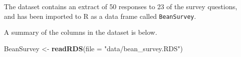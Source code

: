 \documentclass[
]{book}
\newenvironment{Shaded}{\begin{snugshade}}{\end{snugshade}}
\newcommand{\DataTypeTok}[1]{\textcolor[rgb]{0.13,0.29,0.53}{#1}}
\newcommand{\KeywordTok}[1]{\textcolor[rgb]{0.13,0.29,0.53}{\textbf{#1}}}
\newcommand{\NormalTok}[1]{#1}
\newcommand{\StringTok}[1]{\textcolor[rgb]{0.31,0.60,0.02}{#1}}
\begin{document}
The dataset contains an extract of 50 responses to 23 of the survey questions, and has been imported to R as a data frame called \texttt{BeanSurvey}.

A summary of the columns in the dataset is below.

\begin{Shaded}
\begin{Highlighting}[]
\NormalTok{BeanSurvey <-}\StringTok{ }\KeywordTok{readRDS}\NormalTok{(}\DataTypeTok{file =} \StringTok{"data/bean_survey.RDS"}\NormalTok{)}
\end{Highlighting}
\end{Shaded}

\providecommand{\docline}[3]{\noalign{\global\setlength{\arrayrulewidth}{#1}}\arrayrulecolor[HTML]{#2}\cline{#3}}

\setlength{\tabcolsep}{8pt}

\renewcommand*{\arraystretch}{1.5}
\end{document}
